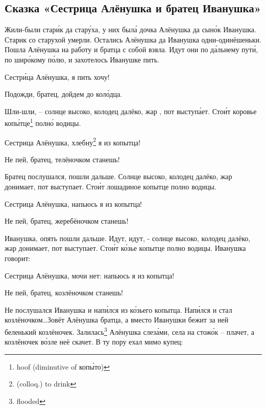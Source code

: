 \subsection{Сказка «Сестрица Алёнушка и братец Иванушка»}
Жили-были стар\'{и}к да стар\'{у}ха, у них был\'{а} дочка Алёнушка да сын\'{о}к Иванушка. Старик со старухой умерли. Остались Алёнушка да Иванушка одни-одинёшеньки. Пошла Алёнушка на работу и братца с собой взяла. Идут они по д\'{а}льнему пут\'{и}, по шир\'{о}кому п\'{о}лю, и захотелось Иванушке пить.
%
\begin{dialogue}
    \item Сестр\'{и}ца Алёнушка, я пить хочу!
    \item Подожди, братец, дойдем до кол\'{о}дца.
\end{dialogue}
%
Шли-шли, -- солнце высоко, колодец далёко, жар , пот выступ\'{а}ет. Сто\'{и}т коровье коп\'{ы}тце\footnote{hoof (diminutive of коп\'{ы}то)} полн\'{о} водицы.
%
\begin{dialogue}
    \item Сестрица Алёнушка, хлебну\footnote{(colloq.) to drink} я из копытца!
    \item Не пей, братец, телёночком станешь!
\end{dialogue}
%
Братец послушался, пошли дальше. Солнце высоко, колодец далёко, жар донимает, пот выступает. Сто\'{и}т лошадиное копытце полно водицы.
%
\begin{dialogue}
    \item Сестрица Алёнушка, напьюсь я из копытца!
    \item Не пей, братец, жеребёночком станешь!
\end{dialogue}
%
 Иванушка, опять пошли дальше. Идут, идут, - солнце высоко, колодец далёко, жар донимает, пот выступает. Сто\'{и}т к\'{о}зье копытце полно водицы. Иванушка говорит:
%
\begin{dialogue}
    \item  Сестрица Алёнушка, мочи нет: напьюсь я из копытца!
    \item  Не пей, братец, козлёночком станешь!
\end{dialogue}
%
Не послушался Иванушка и нап\'{и}лся из к\'{о}зьего копытца. Нап\'{и}лся и стал козлёночком\dots Зовёт Алёнушка братца, а вместо Иванушки бежит за ней беленький козлёночек. Залилась\footnote{flooded} Алёнушка слез\'{а}ми, села на стож\'{о}к -- плачет, а козлёночек в\'{о}зле неё скачет. В ту пору ехал мимо купец:
